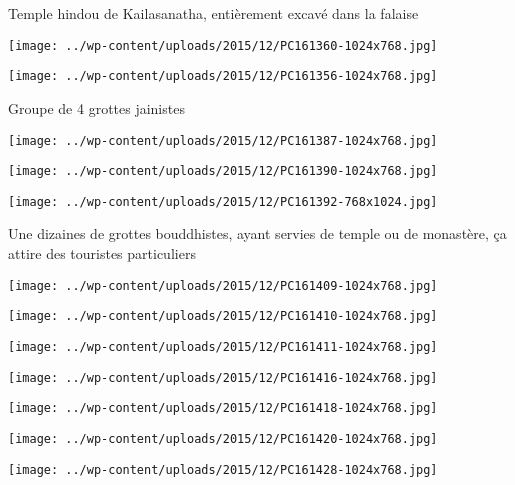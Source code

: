  Temple hindou de Kailasanatha, entièrement excavé dans la falaise \newline
 \newline
\centerline{\texttt{[image: ../wp-content/uploads/2015/12/PC161360-1024x768.jpg]} } 
 \newline
 \newline
\centerline{\texttt{[image: ../wp-content/uploads/2015/12/PC161356-1024x768.jpg]} } 
 \newline
 Groupe de 4 grottes jainistes \newline
 \newline
\centerline{\texttt{[image: ../wp-content/uploads/2015/12/PC161387-1024x768.jpg]} } 
 \newline
 \newline
\centerline{\texttt{[image: ../wp-content/uploads/2015/12/PC161390-1024x768.jpg]} } 
 \newline
 \newline
\centerline{\texttt{[image: ../wp-content/uploads/2015/12/PC161392-768x1024.jpg]} } 
 \newline
 Une dizaines de grottes bouddhistes, ayant servies de temple ou de monastère, ça attire des touristes particuliers \newline
 \newline
\centerline{\texttt{[image: ../wp-content/uploads/2015/12/PC161409-1024x768.jpg]} } 
 \newline
 \newline
\centerline{\texttt{[image: ../wp-content/uploads/2015/12/PC161410-1024x768.jpg]} } 
 \newline
 \newline
\centerline{\texttt{[image: ../wp-content/uploads/2015/12/PC161411-1024x768.jpg]} } 
 \newline
 \newline
\centerline{\texttt{[image: ../wp-content/uploads/2015/12/PC161416-1024x768.jpg]} } 
 \newline
 \newline
\centerline{\texttt{[image: ../wp-content/uploads/2015/12/PC161418-1024x768.jpg]} } 
 \newline
 \newline
\centerline{\texttt{[image: ../wp-content/uploads/2015/12/PC161420-1024x768.jpg]} } 
 \newline
 \newline
\centerline{\texttt{[image: ../wp-content/uploads/2015/12/PC161428-1024x768.jpg]} } 
